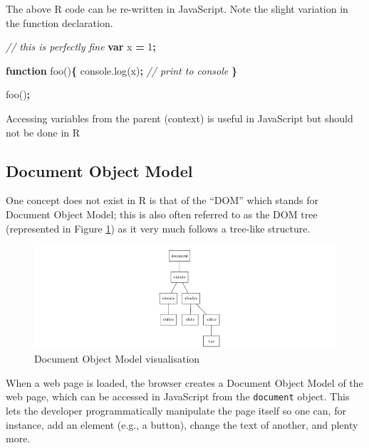 \documentclass[10pt,]{krantz}
\makeatletter
\newenvironment{Shaded}{\begin{snugshade}}{\end{snugshade}}
\newcommand{\AttributeTok}[1]{\textcolor[rgb]{0.61,0.61,0.61}{#1}}
\newcommand{\CommentTok}[1]{\textcolor[rgb]{0.37,0.37,0.37}{\textit{#1}}}
\newcommand{\DecValTok}[1]{\textcolor[rgb]{0.06,0.06,0.06}{#1}}
\newcommand{\KeywordTok}[1]{\textcolor[rgb]{0.27,0.27,0.27}{\textbf{#1}}}
\newcommand{\NormalTok}[1]{#1}
\newcommand{\OperatorTok}[1]{\textcolor[rgb]{0.43,0.43,0.43}{\textbf{#1}}}
\newcommand{\VariableTok}[1]{\textcolor[rgb]{0,0,0}{#1}}
\newenvironment{kframe}{%
\medskip{}
\setlength{\fboxsep}{.8em}
 \def\at@end@of@kframe{}%
 \ifinner\ifhmode%
  \def\at@end@of@kframe{\end{minipage}}%
  \begin{minipage}{\columnwidth}%
 \fi\fi%
 \def\FrameCommand##1{\hskip\@totalleftmargin \hskip-\fboxsep
 \colorbox{shadecolor}{##1}\hskip-\fboxsep
     \hskip-\linewidth \hskip-\@totalleftmargin \hskip\columnwidth}%
 \MakeFramed {\advance\hsize-\width
   \@totalleftmargin\z@ \linewidth\hsize
   \@setminipage}}%
 {\par\unskip\endMakeFramed%
 \at@end@of@kframe}
\renewenvironment{Shaded}{\begin{kframe}}{\end{kframe}}
\newenvironment{rmdblock}[1]
  {
  \begin{itemize}
  \renewcommand{\labelitemi}{
    \raisebox{-.7\height}[0pt][0pt]{
      {\setkeys{Gin}{width=3em,keepaspectratio}\texttt{[image: images/\#1]}}
    }
  }
  \setlength{\fboxsep}{1em}
  \begin{kframe}
  \item
  }
  {
  \end{kframe}
  \end{itemize}
  }
\newenvironment{rmdnote}
  {\begin{rmdblock}{note}}
  {\end{rmdblock}}
\makeatother
\begin{document}
The above R code can be re-written in JavaScript. Note the slight variation in the function declaration.

\begin{Shaded}
\begin{Highlighting}[]
\CommentTok{// this is perfectly fine}
\KeywordTok{var}\NormalTok{ x }\OperatorTok{=} \DecValTok{1}\OperatorTok{;}

\KeywordTok{function} \AttributeTok{foo}\NormalTok{()}\OperatorTok{\{}
  \VariableTok{console}\NormalTok{.}\AttributeTok{log}\NormalTok{(x)}\OperatorTok{;} \CommentTok{// print to console}
\OperatorTok{\}}

\AttributeTok{foo}\NormalTok{()}\OperatorTok{;}
\end{Highlighting}
\end{Shaded}

\begin{rmdnote}
Accessing variables from the parent  (context) is
useful in JavaScript but should not be done in R
\end{rmdnote}

\hypertarget{basics-object-model}{%
\subsection{Document Object Model}\label{basics-object-model}}

One concept does not exist in R is that of the ``DOM'' which stands for Document Object Model; this is also often referred to as the DOM tree (represented in Figure \ref{fig:dom-viz}) as it very much follows a tree-like structure.

\begin{figure}[H]

{\centering \includegraphics[width=1\linewidth]{images/02-dom-viz} 

}

\caption{Document Object Model visualisation}\label{fig:dom-viz}
\end{figure}

When a web page is loaded, the browser creates a Document Object Model of the web page, which can be accessed in JavaScript from the \texttt{document} object. This lets the developer programmatically manipulate the page itself so one can, for instance, add an element (e.g., a button), change the text of another, and plenty more.
\end{document}
